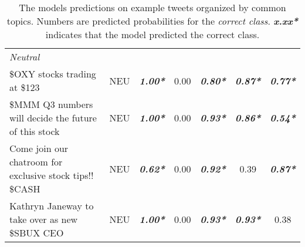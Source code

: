 \begin{table}[!ht]
\begin{tabular}{m{7.37cm}cccccc}
\cmidrule(l){1-1}
\emph{Neutral} \\
\cmidrule(l){1-7}
\$OXY stocks trading at \$123 & NEU & \emph{\textbf{1.00*}} & 0.00 & \emph{\textbf{0.80*}} & \emph{\textbf{0.87*}} & \emph{\textbf{0.77*}} \\
\$MMM Q3 numbers will decide the future of this stock & NEU & \emph{\textbf{1.00*}} & 0.00 & \emph{\textbf{0.93*}} & \emph{\textbf{0.86*}} & \emph{\textbf{0.54*}} \\
Come join our chatroom for exclusive stock tips!! \$CASH & NEU & \emph{\textbf{0.62*}} & 0.00 & \emph{\textbf{0.92*}} & 0.39 & \emph{\textbf{0.87*}} \\
Kathryn Janeway to take over as new \$SBUX CEO & NEU & \emph{\textbf{1.00*}} & 0.00 & \emph{\textbf{0.93*}} & \emph{\textbf{0.93*}} & 0.38 \\



	\bottomrule
	\end{tabular}
	\caption{The models predictions on example tweets organized by common topics. Numbers are predicted probabilities for the \emph{correct class}. \emph{\textbf{x.xx*}} indicates that the model predicted the correct class.}
	\label{table-example-tweets}
\end{table}